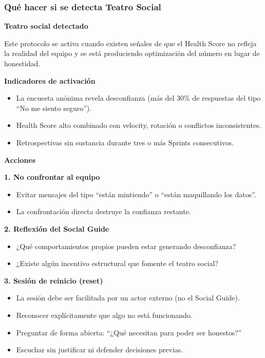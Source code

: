 \subsubsection{Qué hacer si se detecta Teatro Social}

\begin{protocolo}
    \textbf{Teatro social detectado}

    Este protocolo se activa cuando existen señales de que el Health Score
    no refleja la realidad del equipo y se está produciendo optimización del
    número en lugar de honestidad.

    \textbf{Indicadores de activación}
    \begin{itemize}
        \item La encuesta anónima revela desconfianza (más del 30\% de respuestas del tipo “No me siento seguro”).
        \item Health Score alto combinado con velocity, rotación o conflictos inconsistentes.
        \item Retrospectivas sin sustancia durante tres o más Sprints consecutivos.
    \end{itemize}

    \textbf{Acciones}

    \textbf{1. No confrontar al equipo}
    \begin{itemize}
        \item Evitar mensajes del tipo “están mintiendo” o “están maquillando los datos”.
        \item La confrontación directa destruye la confianza restante.
    \end{itemize}

    \textbf{2. Reflexión del Social Guide}
    \begin{itemize}
        \item ¿Qué comportamientos propios pueden estar generando desconfianza?
        \item ¿Existe algún incentivo estructural que fomente el teatro social?
    \end{itemize}

    \textbf{3. Sesión de reinicio (reset)}
    \begin{itemize}
        \item La sesión debe ser facilitada por un actor externo (no el Social Guide).
        \item Reconocer explícitamente que algo no está funcionando.
        \item Preguntar de forma abierta: “¿Qué necesitan para poder ser honestos?”
        \item Escuchar sin justificar ni defender decisiones previas.
    \end{itemize}


\end{protocolo}
